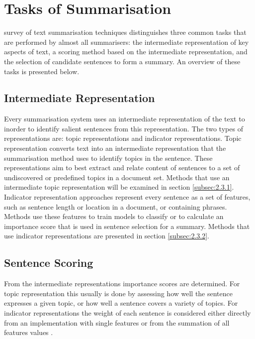 \section{Tasks of Summarisation}
\label{sec:2.2}

\citet{nenkova2012survey} survey of text summarisation techniques distinguishes three common tasks that are performed by almost all summarisers: the intermediate representation of key aspects of text, a scoring method based on the intermediate representation, and the selection of candidate sentences to form a summary. An overview of these tasks is presented below.

\subsection{Intermediate Representation}
\label{subsec:2.2.1}

Every summarisation system uses an intermediate representation of the text to inorder to identify salient sentences from this representation. The two types of representations are: topic representations and indicator representations. Topic representation converts text into an intermediate representation that the summarisation method uses to identify topics in the sentence. These representations aim to best extract and relate content of sentences to a set of undiscovered or predefined topics in a document set. Methods that use an intermediate topic representation will be examined in section \ref{subsec:2.3.1}. Indicator representation approaches represent every sentence as a set of features, such as sentence length or location in a document, or containing phrases. Methods use these features to train models to classify or to calculate an importance score that is used in sentence selection for a summary. Methods that use indicator representations are presented in section \ref{subsec:2.3.2}.

\subsection{Sentence Scoring}
\label{subsec:2.2.2}

From the intermediate representations importance scores are determined. For topic representation this usually is done by assessing how well the sentence expresses a given topic, or how well a sentence covers a variety of topics. For indicator representations the weight of each sentence is considered either directly from an implementation with single features \citep{erkan2004lexrank} or from the summation of all features values \citep{fattah2014hybrid}.

